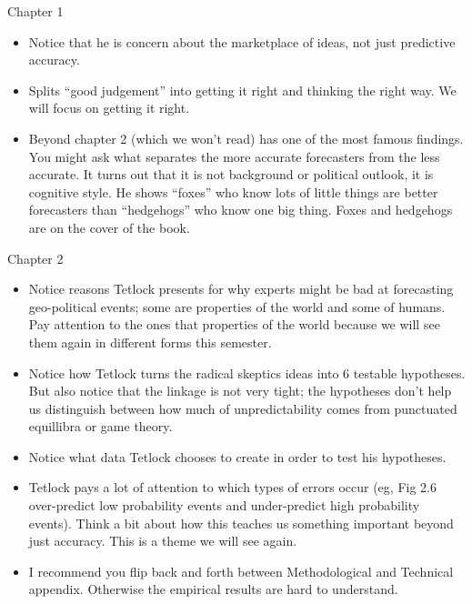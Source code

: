 \documentclass[aspectratio=169]{beamer}
\begin{document}
\begin{frame}

Chapter 1
\begin{itemize}
\item Notice that he is concern about the marketplace of ideas, not just predictive accuracy.
\pause
\item Splits ``good judgement'' into getting it right and thinking the right way.  We will focus on getting it right.
\pause
\item Beyond chapter 2 (which we won't read) has one of the most famous findings. You might ask what separates the more accurate forecasters from the less accurate.  It turns out that it is not background or political outlook, it is cognitive style.  He shows ``foxes'' who know lots of little things are better forecasters than ``hedgehogs'' who know one big thing.  Foxes and hedgehogs are on the cover of the book. 
\end{itemize}

\end{frame}
\begin{frame}

Chapter 2
\begin{itemize}
\item Notice reasons Tetlock presents for why experts might be bad at forecasting geo-political events; some are properties of the world and some of humans.  Pay attention to the ones that properties of the world because we will see them again in different forms this semester.
\pause
\item Notice how Tetlock turns the radical skeptics ideas into 6 testable hypotheses. But also notice that the linkage is not very tight; the hypotheses don't help us distinguish between how much of unpredictability comes from punctuated equillibra or game theory.
\pause
\item Notice what data Tetlock chooses to create in order to test his hypotheses.
\pause
\item Tetlock pays a lot of attention to which types of errors occur (eg, Fig 2.6 over-predict low probability events and under-predict high probability events).  Think a bit about how this teaches us something important beyond just accuracy.  This is a theme we will see again.
\pause
\item I recommend you flip back and forth between Methodological and Technical appendix.  Otherwise the empirical results are hard to understand.
\end{itemize}

\end{frame}
\end{document}
